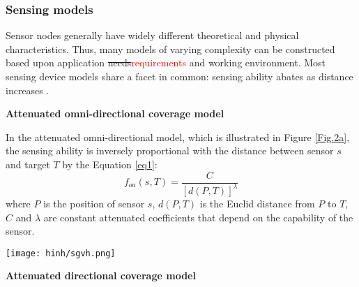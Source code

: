 \documentclass[final]{elsarticle}
\begin{document}
\subsubsection{Sensing models}
Sensor nodes generally have widely different theoretical and physical characteristics. Thus, many models of varying complexity can be constructed based upon application \sout{needs}\textcolor{red}{requirements} and working environment. Most sensing device models share a facet in common: sensing ability abates as distance increases \cite{megerian2002exposure}.

\noindent\textbf{Attenuated omni-directional coverage model}

In the attenuated omni-directional model, which is illustrated in Figure \ref{Fig.2a}, the sensing ability is inversely proportional with the distance between sensor $ s $ and target $ T $ by the Equation \ref{eq1}:
\begin{equation}
\label{eq1}
f_{oa}({s},T) = \frac{C}{{{{\left[ {d(P,T)} \right]}^\lambda }}}
\end{equation}
where $ P $ is the position of sensor $ s $, $ d(P,T) $ is the Euclid distance from $ P $ to $ T $, $ C $ and $ \lambda $ are constant attenuated coefficients that depend on the capability of the sensor. 
\begin{figure*}[h]
	\centering
	\texttt{[image: hinh/sgvh.png]}
	\caption{Attenuated sensing ability of an omni-directional sensor}
	\label{Fig.2a}       %
\end{figure*}

\noindent\textbf{Attenuated directional coverage model}
\end{document}
